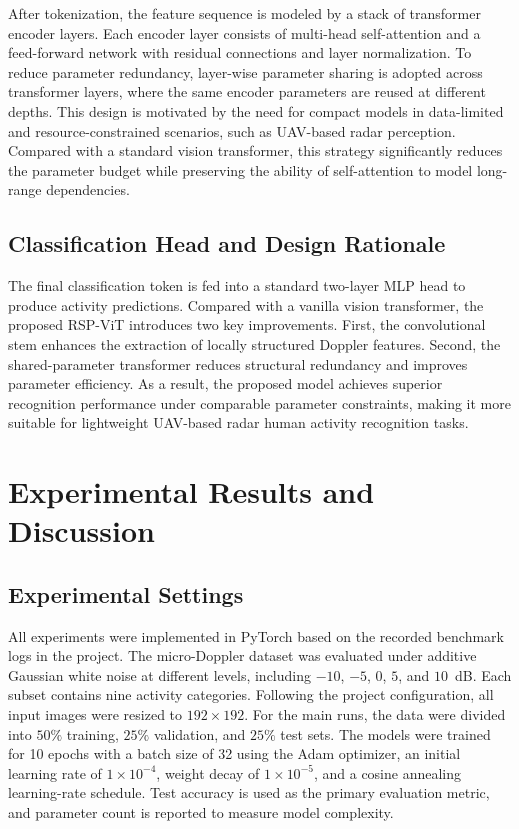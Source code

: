 \documentclass{svproc}
\begin{document}
After tokenization, the feature sequence is modeled by a stack of transformer encoder layers. Each encoder layer consists of multi-head self-attention and a feed-forward network with residual connections and layer normalization. To reduce parameter redundancy, layer-wise parameter sharing is adopted across transformer layers, where the same encoder parameters are reused at different depths. This design is motivated by the need for compact models in data-limited and resource-constrained scenarios, such as UAV-based radar perception. Compared with a standard vision transformer, this strategy significantly reduces the parameter budget while preserving the ability of self-attention to model long-range dependencies.

\subsection{Classification Head and Design Rationale}

The final classification token is fed into a standard two-layer MLP head to produce activity predictions. Compared with a vanilla vision transformer, the proposed RSP-ViT introduces two key improvements. First, the convolutional stem enhances the extraction of locally structured Doppler features. Second, the shared-parameter transformer reduces structural redundancy and improves parameter efficiency. As a result, the proposed model achieves superior recognition performance under comparable parameter constraints, making it more suitable for lightweight UAV-based radar human activity recognition tasks.





\section{Experimental Results and Discussion}

\subsection{Experimental Settings}

All experiments were implemented in PyTorch based on the recorded benchmark logs in the project. The micro-Doppler dataset was evaluated under additive Gaussian white noise at different levels, including $-10$, $-5$, $0$, $5$, and $10$~dB. Each subset contains nine activity categories. Following the project configuration, all input images were resized to $192 \times 192$. For the main runs, the data were divided into $50\%$ training, $25\%$ validation, and $25\%$ test sets. The models were trained for 10 epochs with a batch size of 32 using the Adam optimizer, an initial learning rate of $1\times10^{-4}$, weight decay of $1\times10^{-5}$, and a cosine annealing learning-rate schedule. Test accuracy is used as the primary evaluation metric, and parameter count is reported to measure model complexity.
\end{document}
